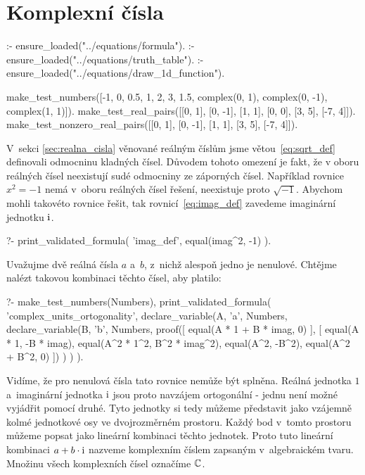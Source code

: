 \chapter{Komplexní čísla}


\begin{prolog}
:- ensure_loaded("../equations/formula").
:- ensure_loaded("../equations/truth_table").
:- ensure_loaded("../equations/draw_1d_function").

make_test_numbers([-1, 0, 0.5, 1, 2, 3, 1.5, complex(0, 1), complex(0, -1), complex(1, 1)]).
make_test_real_pairs([[0, 1], [0, -1], [1, 1], [0, 0], [3, 5], [-7, 4]]).
make_test_nonzero_real_pairs([[0, 1], [0, -1], [1, 1], [3, 5], [-7, 4]]).
\end{prolog}

V~sekci \ref{sec:realna_cisla} věnované reálným číslům jsme větou~\eqref{eq:sqrt_def} definovali odmocninu kladných čísel. Důvodem tohoto omezení je fakt, že v oboru reálných čísel neexistují sudé odmocniny ze záporných čísel. Například rovnice \(x^2 = -1\) nemá v~oboru reálných čísel řešení, neexistuje proto \(\sqrt{-1}\). Abychom mohli takovéto rovnice řešit, tak rovnicí~\eqref{eq:imag_def} zavedeme imaginární jednotku \(\mathrm{i}\).

\begin{fact}
\begin{prolog}
?-	print_validated_formula(
		'imag_def',
		equal(imag^2, -1)
	).
\end{prolog}
\end{fact}

Uvažujme dvě reálná čísla \(a\) a~\(b\), z~nichž alespoň jedno je nenulové. Chtějme nalézt takovou kombinaci těchto čísel, aby platilo:

\begin{prolog}
?-	make_test_numbers(Numbers),
	print_validated_formula(
		'complex_units_ortogonality',
		declare_variable(A, 'a', Numbers,
			declare_variable(B, 'b', Numbers,
				proof([
					equal(A * 1 + B * imag, 0)
				],
				[
					equal(A * 1, -B * imag),
					equal(A^2 * 1^2, B^2 * imag^2),
					equal(A^2, -B^2),
					equal(A^2 + B^2, 0)
				])
			)
		)
	).
\end{prolog}

Vidíme, že pro nenulová čísla tato rovnice nemůže být splněna. Reálná jednotka \(1\) a~imaginární jednotka \(\mathrm{i}\) jsou proto navzájem ortogonální - jednu není možné vyjádřit pomocí druhé. Tyto jednotky si tedy můžeme představit jako vzájemně kolmé jednotkové osy ve dvojrozměrném prostoru. Každý bod v~tomto prostoru můžeme popsat jako lineární kombinaci těchto jednotek. Proto tuto lineární kombinaci \(a + b \cdot \mathrm{i}\) nazveme komplexním číslem zapsaným v~algebraickém tvaru. Množinu všech komplexních čísel označíme \(\mathbb{C}\).


